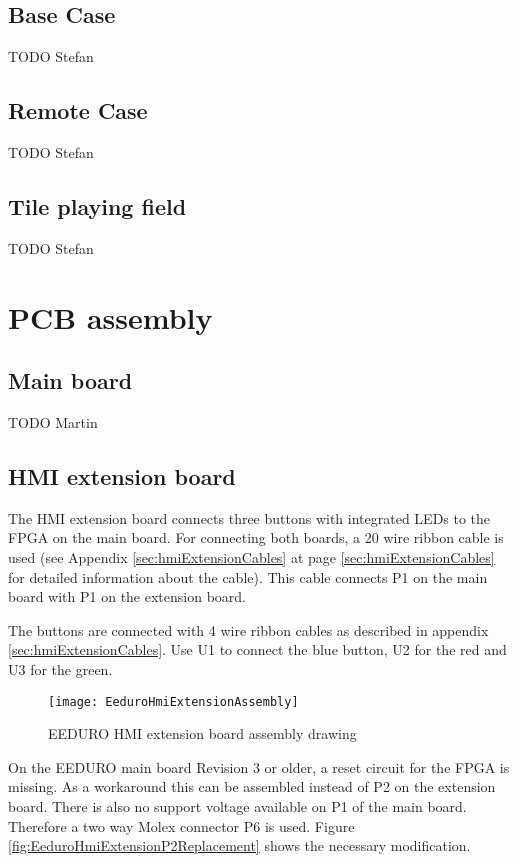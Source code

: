 \section{Base Case}
TODO Stefan

\section{Remote Case}
TODO Stefan

\section{Tile playing field}
TODO Stefan

\chapter{PCB assembly}
\section{Main board}
TODO Martin

\section{HMI extension board}

The HMI extension board connects three buttons with integrated LEDs to the FPGA on the main board. For connecting both boards, a 20 wire ribbon cable is used (see Appendix \ref{sec:hmiExtensionCables} at page \ref{sec:hmiExtensionCables} for detailed information about the cable). This cable connects P1 on the main board with P1 on the extension board.

The buttons are connected with 4 wire ribbon cables as described in appendix \ref{sec:hmiExtensionCables}. Use U1 to connect the blue button, U2 for the red and U3 for the green.

\begin{figure}[htbp]
	\centering
	\texttt{[image: EeduroHmiExtensionAssembly]}
	\caption{EEDURO HMI extension board assembly drawing}
	\label{fig:EeduroHmiExtensionAssembly}
\end{figure}

On the EEDURO main board Revision 3 or older, a reset circuit for the FPGA is missing. As a workaround this can be assembled instead of P2 on the extension board. There is also no support voltage available on P1 of the main board. Therefore a two way Molex connector P6 is used. Figure \ref{fig:EeduroHmiExtensionP2Replacement} shows the necessary modification.

